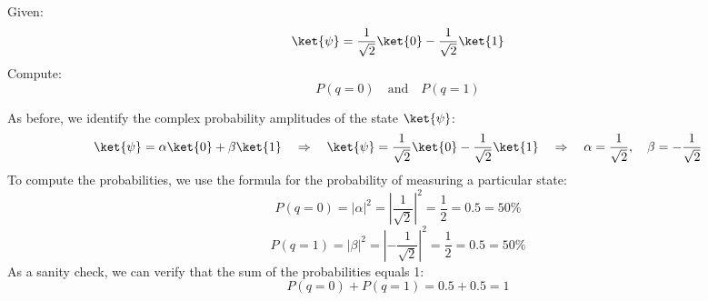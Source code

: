 \highspace
\exercise Given:
\begin{equation*}
    \ket{\psi} = \dfrac{1}{\sqrt{2}}\ket{0} - \dfrac{1}{\sqrt{2}}\ket{1}
\end{equation*}
Compute:
\begin{equation*}
    P\left(q = 0\right) \quad \text{and} \quad P\left(q = 1\right)
\end{equation*}

\highspace
\solution As before, we identify the complex probability amplitudes of the state $\ket{\psi}$:
\begin{equation*}
    \ket{\psi} = \alpha\ket{0} + \beta\ket{1} \quad \Rightarrow \quad \ket{\psi} = \dfrac{1}{\sqrt{2}}\ket{0} - \dfrac{1}{\sqrt{2}}\ket{1} \quad \Rightarrow \quad \alpha = \dfrac{1}{\sqrt{2}}, \quad \beta = -\dfrac{1}{\sqrt{2}}
\end{equation*}
To compute the probabilities, we use the formula for the probability of measuring a particular state:
\begin{equation*}
    P\left(q = 0\right) = \left|\alpha\right|^2 = \left|\dfrac{1}{\sqrt{2}}\right|^2 = \dfrac{1}{2} = 0.5 = 50\%
\end{equation*}
\begin{equation*}
    P\left(q = 1\right) = \left|\beta\right|^2 = \left|-\dfrac{1}{\sqrt{2}}\right|^2 = \dfrac{1}{2} = 0.5 = 50\%
\end{equation*}
As a sanity check, we can verify that the sum of the probabilities equals 1:
\begin{equation*}
    P\left(q = 0\right) + P\left(q = 1\right) = 0.5 + 0.5 = 1
\end{equation*}
